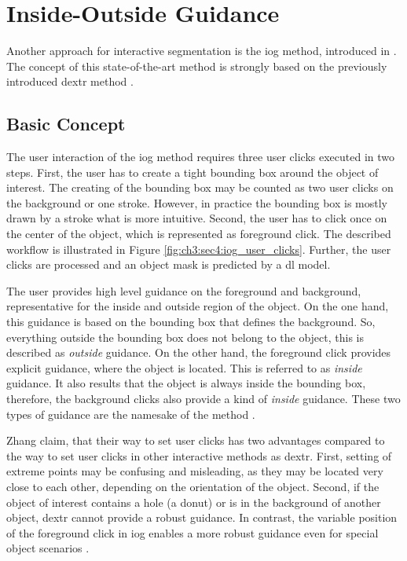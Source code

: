 
\section{Inside-Outside Guidance}\label{ord:ch3:sec4}

Another approach for interactive segmentation is the \gls{iog} method, introduced in \cite{Zha20-IOG}.
The concept of this state-of-the-art method is strongly based on the previously introduced \gls{dextr} method \cite{Man18-DEXTR}.

\subsection{Basic Concept}\label{ord:ch3:sec4:subsec1}
The user interaction of the \gls{iog} method requires three user clicks executed in two steps.
First, the user has to create a tight bounding box around the object of interest. 
The creating of the bounding box may be counted as two user clicks on the background or one stroke.
However, in practice the bounding box is mostly drawn by a stroke what is more intuitive.
Second, the user has to click once on the center of the object, which is represented as foreground click. 
The described workflow is illustrated in Figure \ref{fig:ch3:sec4:iog_user_clicks}.
Further, the user clicks are processed and an object mask is predicted by a \gls{dl} model.

The user provides high level guidance on the foreground and background, representative for the inside and outside region of the object.
On the one hand, this guidance is based on the bounding box that defines the background.
So, everything outside the bounding box does not belong to the object, this is described as \textit{outside} guidance.
On the other hand, the foreground click provides explicit guidance, where the object is located.
This is referred to as \textit{inside} guidance.
It also results that the object is always inside the bounding box, therefore, the background clicks also provide a kind of \textit{inside} guidance. 
These two types of guidance are the namesake of the method .

Zhang \etal claim, that their way to set user clicks has two advantages compared to the way to set user clicks in other interactive methods as \gls{dextr}.
First, setting of extreme points may be confusing and misleading, as they may be located very close to each other, depending on the orientation of the object.
Second, if the object of interest contains a hole (\eg a donut) or is in the background of another object, \gls{dextr} cannot provide a robust guidance.
In contrast, the variable position of the foreground click in \gls{iog} enables a more robust guidance even for special object scenarios \cite{Zha20-IOG}.

